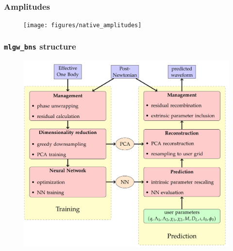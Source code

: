 \documentclass{beamer}
\begin{document}
\begin{frame}
    \frametitle{Amplitudes}
    \begin{figure}[ht]
    \centering
    \texttt{[image: figures/native\_amplitudes]}
    \label{fig:native_amplitudes}
    \end{figure}
\end{frame}



\begin{frame}
    \frametitle{\texttt{mlgw\_bns} structure}
    \vspace*{-.3cm}
    \begin{figure}[ht]
    \centering
    \includegraphics[width=.775\textwidth]{figures/flowchart}
    \label{fig:flowchart}
    \end{figure}
\end{frame}
\end{document}
